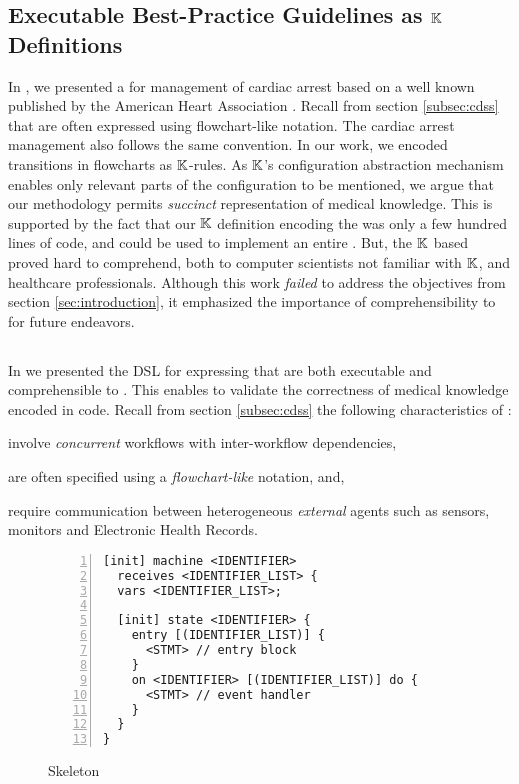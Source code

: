 \subsection{Executable Best-Practice Guidelines as $\mathbb{K}$ Definitions}\label{subsec:BPG-in-K}

In \cite{Saxena22TR}, we presented a \CDSS{} for management of
cardiac arrest based on a well known \BPG{} published by the American Heart
Association \cite{AHAUrl}. Recall from section \ref{subsec:cdss} that
\BPGs{} are often expressed using flowchart-like notation. The cardiac arrest
management \BPG{} also follows the same convention. In our work, we encoded
transitions in \BPG{} flowcharts as $\mathbb{K}$-rules. As $\mathbb{K}$'s
configuration abstraction mechanism enables only relevant parts of the
configuration to be mentioned, we argue that our methodology permits
\emph{succinct} representation of medical knowledge. This is supported by
the fact that our $\mathbb{K}$ definition encoding the \BPG{} was only a few hundred lines of
code, and could be used to implement an entire \CDSS{}. But, the $\mathbb{K}$ based
\BPG{} proved hard to comprehend, both to computer scientists not familiar with
$\mathbb{K}$, and healthcare professionals. Although this work \emph{failed} to address
the objectives from section \ref{sec:introduction}, it emphasized the importance
of comprehensibility to \HCPs{} for future endeavors.

\subsection{\MediK{}}\label{subsec:medik}

In \cite{SaxenaFMCAD23} we presented the \MediK{} DSL for expressing
\BPGs{} that are both executable and comprehensible to \HCPs{}. This
enables \HCPs{} to validate the correctness of medical knowledge encoded
in \MediK{} code. Recall from section \ref{subsec:cdss} the following
characteristics of \BPGs{}:
\begin{enumerate*}[label=(\alph*)]
  \item involve \emph{concurrent} workflows with inter-workflow dependencies,
  \item are often specified using a \emph{flowchart-like} notation, and,
  \item require communication between heterogeneous \emph{external} agents such
    as sensors, monitors and Electronic Health Records.
\end{enumerate*}

\begin{wrapfigure}{l}{0.45\textwidth}
    \caption{\MediK{} \FSM{} Skeleton}\label{fig:medik-skeleton}
\begin{lstlisting}[style=mediksty
,language=medik
,basicstyle=\ttfamily\notsotiny
,numbers=left
,numberstyle=\tiny
,framexleftmargin=1.5em
,xleftmargin=2em
]
[init] machine <IDENTIFIER>
  receives <IDENTIFIER_LIST> {
  vars <IDENTIFIER_LIST>;

  [init] state <IDENTIFIER> {
    entry [(IDENTIFIER_LIST)] {
      <STMT> // entry block
    }
    on <IDENTIFIER> [(IDENTIFIER_LIST)] do {
      <STMT> // event handler
    }
  }
}
\end{lstlisting}
\end{wrapfigure}

